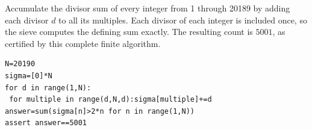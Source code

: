 Accumulate the divisor sum of every integer from 1 through 20189 by adding each divisor $d$ to all its multiples. Each divisor of each integer is included once, so the sieve computes the defining sum exactly. The resulting count is $\boxed{5001}$, as certified by this complete finite algorithm.
\begin{verbatim}
N=20190
sigma=[0]*N
for d in range(1,N):
 for multiple in range(d,N,d):sigma[multiple]+=d
answer=sum(sigma[n]>2*n for n in range(1,N))
assert answer==5001
\end{verbatim}
